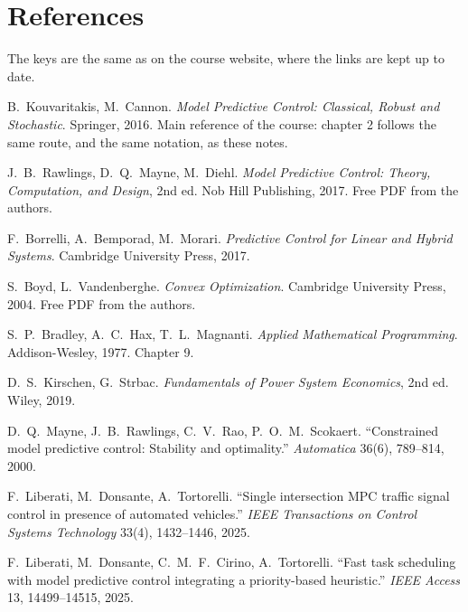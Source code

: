 \clearpage
\section*{References}

The keys are the same as on the course website, where the links are kept up to date.

\begin{description}[style=nextline,leftmargin=0pt,labelsep=0pt,itemsep=4pt]
  \item[\refkey{Cannon\_2016}] B.~Kouvaritakis, M.~Cannon. \emph{Model Predictive Control:
    Classical, Robust and Stochastic}. Springer, 2016. Main reference of the course: chapter 2
    follows the same route, and the same notation, as these notes.
  \item[\refkey{Rawlings\_2017}] J.~B.~Rawlings, D.~Q.~Mayne, M.~Diehl. \emph{Model Predictive
    Control: Theory, Computation, and Design}, 2nd ed. Nob Hill Publishing, 2017. Free PDF from
    the authors.
  \item[\refkey{Borrelli\_2017}] F.~Borrelli, A.~Bemporad, M.~Morari. \emph{Predictive Control for
    Linear and Hybrid Systems}. Cambridge University Press, 2017.
  \item[\refkey{Boyd\_2004}] S.~Boyd, L.~Vandenberghe. \emph{Convex Optimization}. Cambridge
    University Press, 2004. Free PDF from the authors.
  \item[\refkey{Hax\_1977}] S.~P.~Bradley, A.~C.~Hax, T.~L.~Magnanti. \emph{Applied Mathematical
    Programming}. Addison-Wesley, 1977. Chapter 9.
  \item[\refkey{Kirschen\_2019}] D.~S.~Kirschen, G.~Strbac. \emph{Fundamentals of Power System
    Economics}, 2nd ed. Wiley, 2019.
  \item[\refkey{Mayne\_2000}] D.~Q.~Mayne, J.~B.~Rawlings, C.~V.~Rao, P.~O.~M.~Scokaert.
    ``Constrained model predictive control: Stability and optimality.'' \emph{Automatica} 36(6),
    789--814, 2000.
  \item[\refkey{Liberati\_2025a}] F.~Liberati, M.~Donsante, A.~Tortorelli. ``Single intersection
    MPC traffic signal control in presence of automated vehicles.'' \emph{IEEE Transactions on
    Control Systems Technology} 33(4), 1432--1446, 2025.
  \item[\refkey{Liberati\_2025b}] F.~Liberati, M.~Donsante, C.~M.~F.~Cirino, A.~Tortorelli. ``Fast
    task scheduling with model predictive control integrating a priority-based heuristic.''
    \emph{IEEE Access} 13, 14499--14515, 2025.
\end{description}
